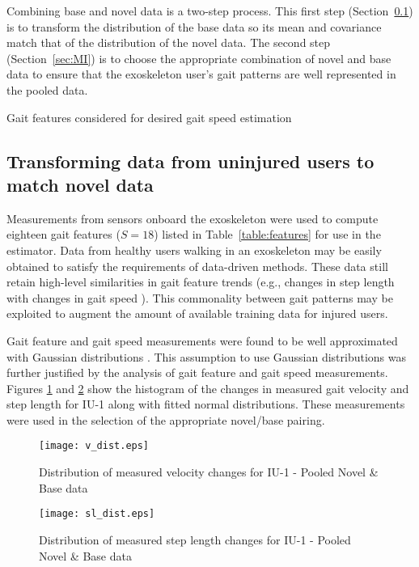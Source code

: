 Combining base and novel data is a two-step process. This first step (Section~\ref{sec:mp_transform}) is to transform the distribution of the base data so its mean and covariance match that of the distribution of the novel data. The second step (Section~\ref{sec:MI}) is to choose the appropriate combination of novel and base data to ensure that the exoskeleton user's gait patterns are well represented in the pooled data.

\begin{table}
	\footnotesize
	\centering
	\caption{Gait features considered for desired gait speed estimation }\label{table:features}
	
\end{table}

\subsection{Transforming data from uninjured users to match novel data} \label{sec:mp_transform}
Measurements from sensors onboard the exoskeleton were used to compute eighteen gait features ($S=18$) listed in Table~\ref{table:features} for use in the estimator. Data from healthy users walking in an exoskeleton may be easily obtained to satisfy the requirements of data-driven methods. These data still retain high-level similarities in gait feature trends (e.g., changes in step length with changes in gait speed \cite{karulkar2021using}). This commonality between gait patterns may be exploited to augment the amount of available training data for injured users.

Gait feature and gait speed measurements were found to be well approximated with Gaussian distributions \cite{austin2011disambiguation}. This assumption to use Gaussian distributions was further justified by the analysis of gait feature and gait speed measurements. Figures \ref{fig:v_dist} and \ref{fig:sl_dist} show the histogram of the changes in measured gait velocity and step length for IU-1 along with fitted normal distributions. These measurements were used in the selection of the appropriate novel/base pairing. 

\begin{figure}
	\centering
	\texttt{[image: v\_dist.eps]}
	\caption{Distribution of measured velocity changes for IU-1 - Pooled Novel \& Base data}\label{fig:v_dist}
\end{figure}

\begin{figure}
	\centering
	\texttt{[image: sl\_dist.eps]}
	\caption{Distribution of measured step length changes for IU-1 - Pooled Novel \& Base data}\label{fig:sl_dist}
\end{figure}

